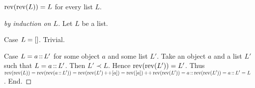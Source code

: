 \documentclass[10pt]{article}
\begin{document}
  \begin{forthel}
    \begin{proposition}
      $\textrm{rev}(\textrm{rev}(L)) = L$ for every list $L$.
    \end{proposition}
    \begin{proof}[by induction on $L$]
      Let $L$ be a list.

      Case $L = []$. Trivial.
    
      Case $L = a \mathop{::} L'$ for some object $a$ and some list $L'$.
        Take an object $a$ and a list $L'$ such that $L = a \mathop{::} L'$.
        Then $L' \prec L$.
        Hence $\textrm{rev}(\textrm{rev}(L')) = L'$.
        Thus $\textrm{rev}(\textrm{rev}(L))
          = \textrm{rev}(\textrm{rev}(a \mathop{::} L'))
          = \textrm{rev}(\textrm{rev}(L') \mathop{++} [a])
          = \textrm{rev}([a]) \mathop{++} \textrm{rev}(\textrm{rev}(L'))
          = a \mathop{::} \textrm{rev}(\textrm{rev}(L'))
          = a \mathop{::} L'
          = L$.
      End.
    \end{proof}
  \end{forthel}
\end{document}
